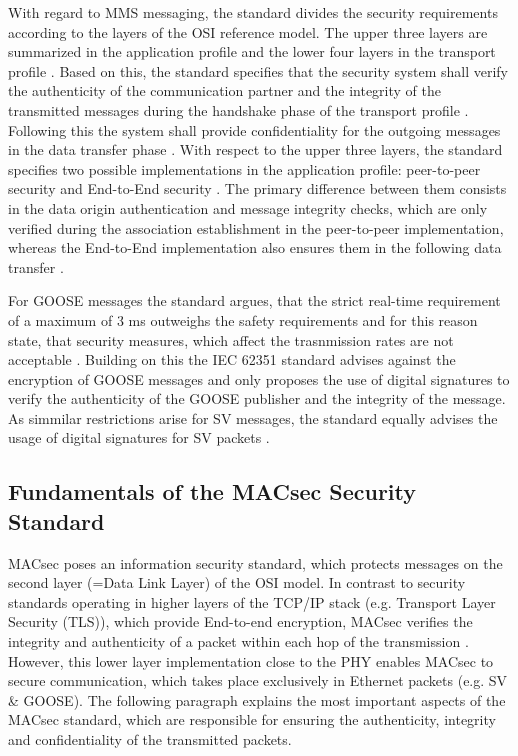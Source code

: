 \documentclass[conference, onecolumn, a4paper]{IEEEtran}
\begin{document}
\smallskip
With regard to MMS messaging, the standard divides the security requirements according to the layers of the OSI reference model. The upper three layers 
are summarized in the application profile and the lower four layers in the transport profile \cite{SecureMMS:2020}. Based on this, the standard specifies 
that the security system shall verify the authenticity of the communication partner and the integrity of the transmitted messages during the handshake 
phase of the transport profile \cite{Review_IEC62351:2019}. Following this the system shall provide confidentiality for the outgoing messages in the 
data transfer phase \cite{SecureMMS:2020}. With respect to the upper three layers, the standard specifies two possible implementations in the application 
profile: peer-to-peer security and End-to-End security \cite{Review_IEC62351:2019}. The primary difference between them consists in the data origin 
authentication and message integrity checks, which are only verified during the association establishment in the peer-to-peer implementation, whereas 
the End-to-End implementation also ensures them in the following data transfer \cite{Review_IEC62351:2019}.

\smallskip
For GOOSE messages the standard argues, that the strict real-time requirement of a maximum of 3 ms \cite{GOOSE_confidentiality_integrity:2020} outweighs 
the safety requirements and for this reason state, that security measures, which affect the trasnmission rates are not acceptable \cite{PoisonedGOOSE:2014}. 
Building on this the IEC 62351 standard advises against the encryption of GOOSE messages and only proposes the use of digital signatures to verify the 
authenticity of the GOOSE publisher and the integrity of the message. As simmilar restrictions arise for SV messages, the standard equally advises the 
usage of digital signatures for SV packets \cite{Review_IEC62351:2019}. 

\subsection{Fundamentals of the MACsec Security Standard}
\noindent MACsec poses an information security standard, which protects messages on the second layer (=Data Link Layer) of the OSI model. In contrast 
to security standards operating in higher layers of the TCP/IP stack (e.g. Transport Layer Security (TLS)), which provide End-to-end encryption, MACsec 
verifies the integrity and authenticity of a packet within each hop of the transmission \cite{Cybersecurity_Substation:2016}. However, this lower layer 
implementation close to the PHY enables MACsec to secure communication, which takes place exclusively in Ethernet packets (e.g. SV \& GOOSE). The 
following paragraph explains the most important aspects of the MACsec standard, which are responsible for ensuring the authenticity, integrity and 
confidentiality of the transmitted packets.
\end{document}
